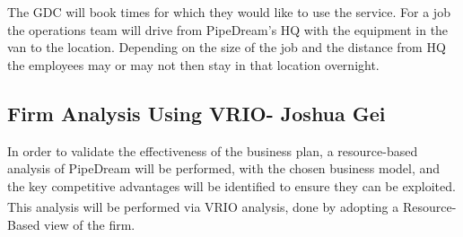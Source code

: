 \documentclass[11pt]{article}		%
\newcommand{\supercite}[1]{\textsuperscript{\cite{#1}}}		%
\begin{document}
	       The GDC will book times for which they would like to use the service. For a job the operations team will drive from PipeDream’s HQ with the equipment in the van to the location. Depending on the size of the job and the distance from HQ the employees may or may not then stay in that location overnight. %
    
    	\subsection[Firm Analysis Using VRIO]{Firm Analysis Using VRIO- Joshua Gei} \label{vrioAnalysisSection}
    	
	In order to validate the effectiveness of the business plan, a resource-based analysis of PipeDream will be performed, with the chosen business model, and the key competitive advantages will be identified to ensure they can be exploited. This analysis will be performed via VRIO analysis\supercite{VRIO}, done by adopting a Resource-Based view of the firm. 
	
	
\end{document}

